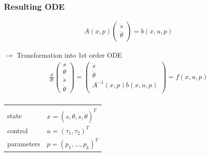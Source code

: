\begin{frame}[c]
	\frametitle{Resulting ODE}
	\vspace{-0.5cm}
	\begin{align*}
		&A(x,p)
		\begin{pmatrix} 
			\ddot{s} \\ \ddot{\theta} \\
		\end{pmatrix}
		= b(x,u,p)
	\end{align*}
	
	$\rightarrow$ Transformation into 1st order ODE
	\begin{align*}
		&\frac{d}{dt}
		\begin{pmatrix}
			s \\ \theta \\ \dot{s} \\ \dot{\theta}
		\end{pmatrix}
		=
		\begin{pmatrix}
			\dot{s} \\ \dot{\theta} \\ A^{-1}(x,p)b(x,u,p) \\
		\end{pmatrix} 
		= f(x,u,p) \\
	\end{align*}
	
	\vspace{-1.0cm}
	
	\begin{tabular}{ll}
		& \\
		state & $ x = (s,\theta,\dot{s},\dot{\theta})^T $ \\
		control & $ u = (\tau_1,\tau_2)^T $ \\
		parameters & $ p = (p_1,...,p_k)^T $ \\
	\end{tabular}
\end{frame}